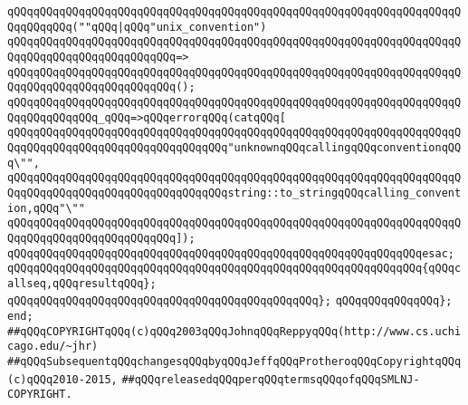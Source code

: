 \newline
\verb|qQQqqQQqqQQqqQQqqQQqqQQqqQQqqQQqqQQqqQQqqQQqqQQqqQQqqQQqqQQqqQQqqQQqqQQqqQQqqQQq(""qQQq|\verb#|qQQq"unix_convention")#\newline
\verb|qQQqqQQqqQQqqQQqqQQqqQQqqQQqqQQqqQQqqQQqqQQqqQQqqQQqqQQqqQQqqQQqqQQqqQQqqQQqqQQqqQQqqQQqqQQqqQQq=>|\newline
\verb|qQQqqQQqqQQqqQQqqQQqqQQqqQQqqQQqqQQqqQQqqQQqqQQqqQQqqQQqqQQqqQQqqQQqqQQqqQQqqQQqqQQqqQQqqQQqqQQq();|\newline
\newline
\verb|qQQqqQQqqQQqqQQqqQQqqQQqqQQqqQQqqQQqqQQqqQQqqQQqqQQqqQQqqQQqqQQqqQQqqQQqqQQqqQQqqQQq_qQQq=>qQQqerrorqQQq(catqQQq[|\newline
\verb|qQQqqQQqqQQqqQQqqQQqqQQqqQQqqQQqqQQqqQQqqQQqqQQqqQQqqQQqqQQqqQQqqQQqqQQqqQQqqQQqqQQqqQQqqQQqqQQqqQQqqQQq"unknownqQQqcallingqQQqconventionqQQq\"",|\newline
\verb|qQQqqQQqqQQqqQQqqQQqqQQqqQQqqQQqqQQqqQQqqQQqqQQqqQQqqQQqqQQqqQQqqQQqqQQqqQQqqQQqqQQqqQQqqQQqqQQqqQQqqQQqstring::to_stringqQQqcalling_convention,qQQq"\""|\newline
\verb|qQQqqQQqqQQqqQQqqQQqqQQqqQQqqQQqqQQqqQQqqQQqqQQqqQQqqQQqqQQqqQQqqQQqqQQqqQQqqQQqqQQqqQQqqQQqqQQq]);|\newline
\verb|qQQqqQQqqQQqqQQqqQQqqQQqqQQqqQQqqQQqqQQqqQQqqQQqqQQqqQQqqQQqqQQqesac;|\newline
\newline
\verb|qQQqqQQqqQQqqQQqqQQqqQQqqQQqqQQqqQQqqQQqqQQqqQQqqQQqqQQqqQQqqQQq{qQQqcallseq,qQQqresultqQQq};|\newline
\verb|qQQqqQQqqQQqqQQqqQQqqQQqqQQqqQQqqQQqqQQqqQQqqQQq};|\newline
\verb|qQQqqQQqqQQqqQQq};|\newline
\verb|end;|\newline
\newline
\newline
\verb|##qQQqCOPYRIGHTqQQq(c)qQQq2003qQQqJohnqQQqReppyqQQq(http://www.cs.uchicago.edu/~jhr)|\newline
\verb|##qQQqSubsequentqQQqchangesqQQqbyqQQqJeffqQQqProtheroqQQqCopyrightqQQq(c)qQQq2010-2015,|\newline
\verb|##qQQqreleasedqQQqperqQQqtermsqQQqofqQQqSMLNJ-COPYRIGHT.|\newline

